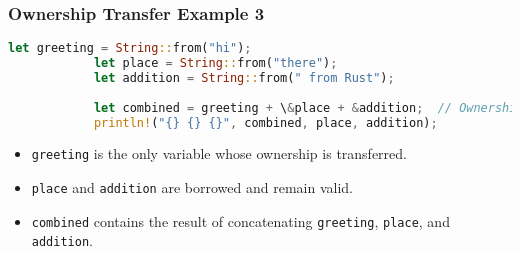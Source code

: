 \documentclass[aspectratio=169, table]{beamer}
\begin{document}
	\begin{frame}[fragile]
		\frametitle{Ownership Transfer Example 3}
		\begin{lstlisting}[language=Rust]
			let greeting = String::from("hi"); 
			let place = String::from("there");
			let addition = String::from(" from Rust");
			
			let combined = greeting + \&place + &addition;  // Ownership of only greeting changed
			println!("{} {} {}", combined, place, addition); 
		\end{lstlisting}
		\begin{itemize}
			\item \texttt{greeting} is the only variable whose ownership is transferred.
			\item \texttt{place} and \texttt{addition} are borrowed and remain valid.
			\item \texttt{combined} contains the result of concatenating \texttt{greeting}, \texttt{place}, and \texttt{addition}.
		\end{itemize}
	\end{frame}
	
\end{document}
